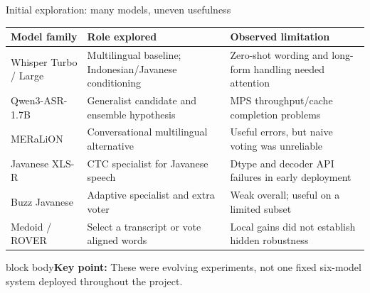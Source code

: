 \documentclass[aspectratio=169,11pt]{beamer}
\newcommand{\takeaway}[1]{\vfill\begin{beamercolorbox}[sep=2mm,wd=\linewidth]{block body}\small\textbf{Key point:} #1\end{beamercolorbox}}
\begin{document}
\begin{frame}{Initial exploration: many models, uneven usefulness}
\small
\begin{tabular}{@{}P{3.7cm}P{6.0cm}P{6.0cm}@{}}\toprule
\textbf{Model family}&\textbf{Role explored}&\textbf{Observed limitation}\\\midrule
Whisper Turbo / Large&Multilingual baseline; Indonesian/Javanese conditioning&Zero-shot wording and long-form handling needed attention\\
Qwen3-ASR-1.7B&Generalist candidate and ensemble hypothesis&MPS throughput/cache completion problems\\
MERaLiON&Conversational multilingual alternative&Useful errors, but naive voting was unreliable\\
Javanese XLS-R&CTC specialist for Javanese speech&Dtype and decoder API failures in early deployment\\
Buzz Javanese&Adaptive specialist and extra voter&Weak overall; useful on a limited subset\\
Medoid / ROVER&Select a transcript or vote aligned words&Local gains did not establish hidden robustness\\\bottomrule
\end{tabular}
\takeaway{These were evolving experiments, not one fixed six-model system deployed throughout the project.}
\end{frame}
\end{document}
